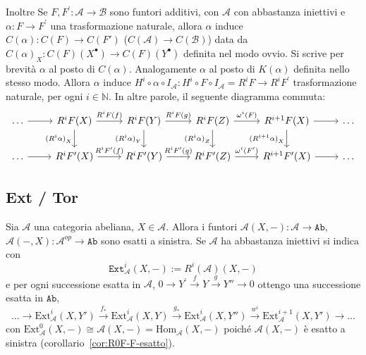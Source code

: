 \begin{remark}{}
Inoltre Se \(F, F^{\prime} : \mathcal{A} \to \mathcal{B}\) sono funtori
additivi, con \(\mathcal{A}\) con abbastanza iniettivi e \(\alpha : F \to
F^{\prime}\) una trasformazione naturale, allora \(\alpha\)  induce
\(C{(\alpha)} : C{(F)} \to C{(F')}\) (\(C{(\mathcal{A})} \to C{(\mathcal{B})}\))
data da \(C{(\alpha)}_X : C{(F)}{(X^\bullet)} \to C{(F)}{(Y^\bullet)}\) definita
nel modo ovvio. Si scrive per brevità \(\alpha\) al posto di \(C{(\alpha)}\).
Analogamente \(\alpha\) al posto di \(K{(\alpha)}\) definita nello stesso modo.
Allora \(\alpha\) induce \(H^{i} \circ \alpha \circ I_{\mathcal{A}}: H^{i}
\circ F \circ I_\mathcal{A} = R^{i}F \to R^{i}F^{\prime}\) trasformazione
naturale, per ogni \(i \in \mathbb{N}\). In altre parole, il seguente diagramma
commuta:
\[ \begin{tikzcd}
	\dots& R^{i}F{(X)} & R^{i}F{(Y)} & R^{i}F{(Z)} & R^{i+1}F{(X)} & \dots \\
    \dots& R^{i}F'{(X)} & R^{i}F'{(Y)} & R^{i}F'{(Z)} &
         R^{i+1}F'{(X)}& \dots
	\arrow[from=1-1, to=1-2]
	\arrow["R^{i}F{(f)}", from=1-2, to=1-3]
	\arrow["R^{i}F'{(f)}", from=2-2, to=2-3]
	\arrow["R^{i}F{(g)}", from=1-3, to=1-4]
	\arrow["{(R^{i}\alpha)}_X"', from=1-2, to=2-2]
	\arrow["{(R^{i}\alpha)}_Y"', from=1-3, to=2-3]
	\arrow["\omega^{i}{(F)}", from=1-4, to=1-5]
	\arrow["{(R^{i}\alpha)}_Z"', from=1-4, to=2-4]
	\arrow[from=1-5, to=1-6]
	\arrow["{(R^{i+1}\alpha)}_X"', from=1-5, to=2-5]
	\arrow[from=2-1, to=2-2]
	\arrow["R^{i}F'{(g)}", from=2-3, to=2-4]
	\arrow["\omega^{i}{(F^{\prime})}", from=2-4, to=2-5]
	\arrow[from=2-5, to=2-6]
\end{tikzcd} \]
\end{remark}

\subsection{Ext / Tor}

   Sia \(\mathcal{A}\) una categoria abeliana, \(X \in \mathcal{A}\). Allora i
   funtori \(\mathcal{A}{(X, -)} : \mathcal{A} \to \mathtt{Ab}\),
   \(\mathcal{A}{(-, X)} : \mathcal{A}^{op} \to \mathtt{Ab}\) sono esatti a
   sinistra. Se \(\mathcal{A}\) ha abbastanza iniettivi si indica con 
   \[
     \mathtt{Ext}_{\mathcal{A}}^{i}{(X, -)} := R^{i}{(\mathcal{A})}{(X, -)}
   \]
   e per ogni successione esatta in \(\mathcal{A}\), \(0 \to Y^{\prime}
   \overset{f}{\to} Y \overset{g}{\to} Y'' \to 0\) ottengo una successione
   esatta in \(\mathtt{Ab}\), 
   \[
     \dots \to \mathrm{Ext}_{\mathcal{A}} ^{i}{(X, Y')} \overset{f_*}{\to}
     \mathrm{Ext}_\mathcal{A}^{i}{(X, Y)} \overset{g_*}{\to}
     \mathrm{Ext}_\mathcal{A}^{i}{(X, Y'')} \overset{w^{i}}{\to}
     \mathrm{Ext}_\mathcal{A}^{i+1}{(X, Y')} \to \dots
   \]
   con \(\mathrm{Ext}_\mathcal{A}^{0}{(X, -)} \cong \mathcal{A}{(X, -)} =
   \mathrm{Hom}_\mathcal{A}{(X, -)}\) poiché \(\mathcal{A}{(X, -)}\) è esatto a
   sinistra (corollario~\ref{cor:R0F-F-esatto}).

